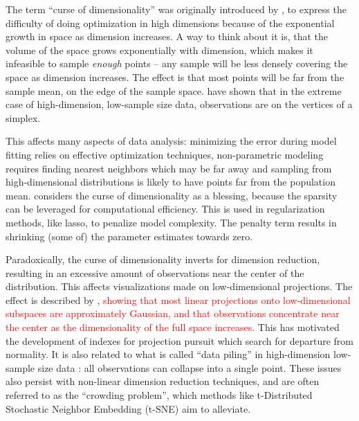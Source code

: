 \documentclass[]{interact}
\theoremstyle{plain}%
\theoremstyle{definition}
\theoremstyle{remark}
\begin{document}
The term ``curse of dimensionality'' was originally introduced by
\citet{BellmanRichard1961}, to express the difficulty of doing
optimization in high dimensions because of the exponential growth in
space as dimension increases. A way to think about it is, that the
volume of the space grows exponentially with dimension, which makes it
infeasible to sample \emph{enough} points -- any sample will be less
densely covering the space as dimension increases. The effect is that
most points will be far from the sample mean, on the edge of the sample
space. \citet{doi:10.1111/j.1467-9868.2005.00510.x} have shown that in
the extreme case of high-dimension, low-sample size data, observations
are on the vertices of a simplex.

This affects many aspects of data analysis: minimizing the error during
model fitting relies on effective optimization techniques,
non-parametric modeling requires finding nearest neighbors which may be
far away and sampling from high-dimensional distributions is likely to
have points far from the population mean. \citet{Donoho00} considers the
curse of dimensionality as a blessing, because the sparsity can be
leveraged for computational efficiency. This is used in regularization
methods, like lasso, to penalize model complexity. The penalty term
results in shrinking (some of) the parameter estimates towards zero.

Paradoxically, the curse of dimensionality inverts for dimension
reduction, resulting in an excessive amount of observations near the
center of the distribution. This affects visualizations made on
low-dimensional projections. The effect is described by
\citet{diaconis1984},
\textcolor{red}{showing that most linear projections onto low-dimensional subspaces are approximately Gaussian, and that observations concentrate near the center as the dimensionality of the full space increases.}
This has motivated the development of indexes for projection pursuit
which search for departure from normality. It is also related to what is
called ``data piling'' in high-dimension low-sample size data
\citep{10.2307/27639976, 10.1093/biomet/asp084}: all observations can
collapse into a single point. These issues also persist with non-linear
dimension reduction techniques, and are often referred to as the
``crowding problem'', which methods like t-Distributed Stochastic
Neighbor Embedding (t-SNE) \citep{tsne} aim to alleviate.
\end{document}
